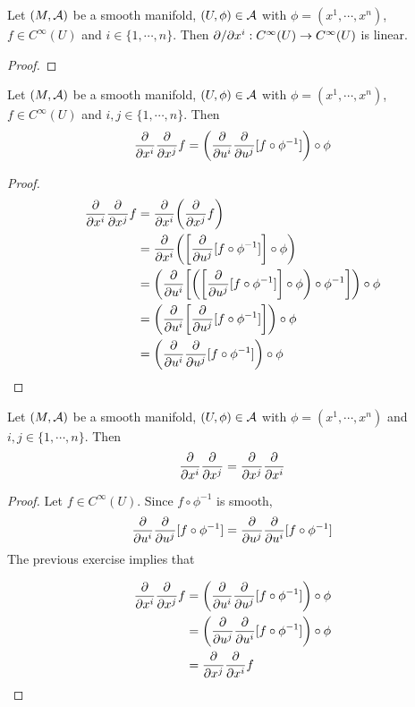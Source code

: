 \documentclass{book}
\begin{document}
\begin{ex}
	Let $(M, \mathcal{A})$ be a smooth manifold, $(U, \phi) \in \mathcal{A}$ with $\phi = (x^1, \cdots, x^n)$, $f \in C^{\infty}(U)$ and $i \in \{1, \cdots, n\}$. Then $\partial / \partial x^i:  C^{\infty}(U) \rightarrow C^{\infty}(U)$ is linear.
\end{ex}

\begin{proof}
\end{proof}

\begin{ex}
	Let $(M, \mathcal{A})$ be a smooth manifold, $(U, \phi) \in \mathcal{A}$ with $\phi = (x^1, \cdots, x^n)$, $f \in C^{\infty}(U)$ and $i,j \in \{1, \cdots, n\}$. Then 
	$$\frac{\partial}{\partial x^i}\frac{\partial}{\partial x^j} f =  \bigg(\frac{\partial}{\partial u^i} \frac{\partial}{\partial u^j}[f \circ \phi^{-1}] \bigg) \circ \phi $$
\end{ex}

\begin{proof}
	
	\begin{align*}
		\frac{\partial}{\partial x^i}\frac{\partial}{\partial x^j} f 
		&=\frac{\partial}{\partial x^i} \bigg(\frac{\partial}{\partial x^j} f \bigg) \\
		&=\frac{\partial}{\partial x^i} \bigg( \bigg[\frac{\partial}{\partial u^j} [f \circ \phi^{-1}] \bigg] \circ \phi \bigg) \\
		&=  \bigg( \frac{\partial}{\partial u^i} \bigg[ \bigg( \bigg[\frac{\partial}{\partial u^j} [f \circ \phi^{-1}] \bigg] \circ \phi \bigg) \circ \phi^{-1} \bigg] \bigg) \circ \phi \\
		&= \bigg( \frac{\partial}{\partial u^i} \bigg[\frac{\partial}{\partial u^j} [f \circ \phi^{-1}] \bigg]  \bigg) \circ \phi \\
		&= \bigg( \frac{\partial}{\partial u^i} \frac{\partial}{\partial u^j} [f \circ \phi^{-1}]  \bigg) \circ \phi \\
	\end{align*}
\end{proof}

\begin{ex}
	Let $(M, \mathcal{A})$ be a smooth manifold, $(U, \phi) \in \mathcal{A}$ with $\phi = (x^1, \cdots, x^n)$ and $i,j \in \{1, \cdots, n\}$. Then 
	\begin{equation*}
		\frac{\partial}{\partial x^i}\frac{\partial}{\partial x^j} =\frac{\partial}{\partial x^j}\frac{\partial}{\partial x^i}
	\end{equation*}
\end{ex}

\begin{proof}
	Let $f \in C^{\infty}(U)$. Since $f \circ \phi^{-1}$ is smooth, $$\frac{\partial}{\partial u^i} \frac{\partial}{\partial u^j} [f \circ \phi^{-1}] = \frac{\partial}{\partial u^j} \frac{\partial}{\partial u^i} [f \circ \phi^{-1}] $$
	The previous exercise implies that 
	
	\begin{align*}
		\frac{\partial}{\partial x^i}\frac{\partial}{\partial x^j}f 
		&= \bigg( \frac{\partial}{\partial u^i} \frac{\partial}{\partial u^j} [f \circ \phi^{-1}]  \bigg) \circ \phi \\
		&= \bigg( \frac{\partial}{\partial u^j} \frac{\partial}{\partial u^i} [f \circ \phi^{-1}]  \bigg) \circ \phi \\
		&=\frac{\partial}{\partial x^j}\frac{\partial}{\partial x^i}f 
	\end{align*}
\end{proof}
\end{document}
